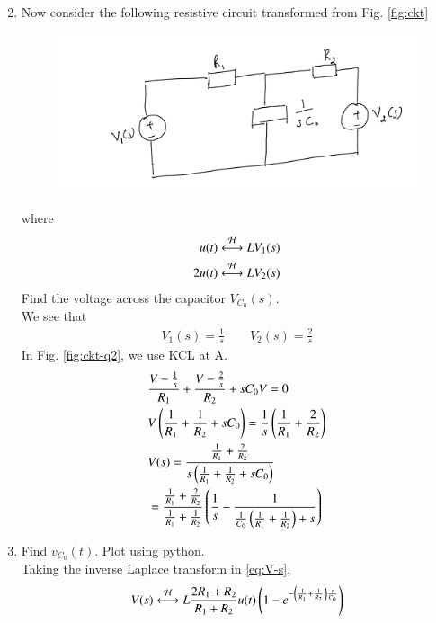 \documentclass[journal,12pt,twocolumn]{IEEEtran}
\renewcommand\thesection{\arabic{section}}
\begin{document}
\begin{enumerate}[label=\arabic*.,ref=\thesection.\theenumi]
\begin{equation}
        \end{equation}
	\item Now consider the following resistive circuit transformed from 
			Fig. \ref{fig:ckt}
		\begin{figure}[!ht]
			\centering
			\includegraphics[width=\columnwidth]{figs/lap-ckt.jpg}
			\caption{}
			\label{fig:lap-ckt}
\end{figure}
		where 
		\begin{align}
			u(t) \overset{\mathcal{H}}{ \longleftrightarrow}{L} V_1(s)
			\\
			2u(t) \overset{\mathcal{H}}{ \longleftrightarrow}{L} V_2(s)
		\end{align}
		Find the voltage across the capacitor $V_{C_0}(s)$.\\
        \solution We see that
        \begin{align}
            V_1(s) = \frac{1}{s} \qquad
            V_2(s) = \frac{2}{s}
        \end{align}
        In Fig. \ref{fig:ckt-q2}, we use KCL at A.
        \begin{align}
            &\frac{V - \frac{1}{s}}{R_1} + \frac{V - \frac{2}{s}}{R_2} + sC_0V = 0 \\
            &V\left(\frac{1}{R_1} + \frac{1}{R_2} + sC_0\right) = \frac{1}{s}\left(\frac{1}{R_1} + \frac{2}{R_2}\right) \\
            &V(s) = \frac{\frac{1}{R_1} + \frac{2}{R_2}}{s\left(\frac{1}{R_1} + \frac{1}{R_2} + sC_0\right)} \\
            &= \frac{\frac{1}{R_1} + \frac{2}{R_2}}{\frac{1}{R_1} + \frac{1}{R_2}}\left(\frac{1}{s} - \frac{1}{\frac{1}{C_0}\left(\frac{1}{R_1} + \frac{1}{R_2}\right) + s}\right) 
            \label{eq:V-s}
        \end{align}
	\item Find $v_{C_0}(t)$.  Plot using python.\\
	\solution Taking the inverse Laplace transform in \eqref{eq:V-s},
    \begin{align}
        &V(s) \system{L} \frac{2R_1 + R_2}{R_1 + R_2}u(t)\brak{1 - e^{-\brak{\frac{1}{R_1} + \frac{1}{R_2}}\frac{t}{C_0}}} \\

\end{align}
\end{enumerate}
\end{document}
